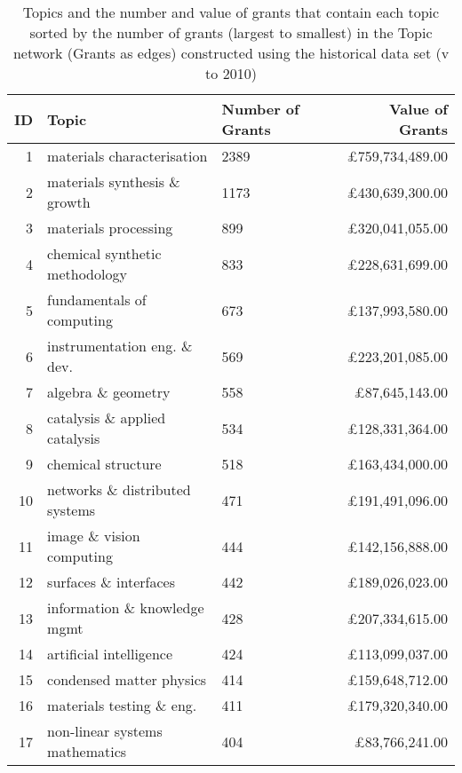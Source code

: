 \begin{spacing}{0.9}
\begin{longtable}[c]{r|>{\raggedleft\arraybackslash}m{6.5cm}|>{\raggedleft\arraybackslash}m{1.9cm}|r}
\caption[Topics and the number and value of grants that contain each topic in the Topic network (Grants as edges) constructed using the historical data set (2000 to 2010)]{Topics and the number and value of grants that contain each topic sorted by the number of grants (largest to smallest) in the Topic network (Grants as edges) constructed using the historical data set (v to 2010)}\\
\label{table:topic_a_past1_topics_appendix}
\textbf{ID} & \textbf{Topic} & \textbf{Number of Grants} & \textbf{Value of Grants}\\
\hline
\endhead
{1} & {materials characterisation} & {2389} & {\pounds759,734,489.00}\\
{2} & {materials synthesis \& growth} & {1173} & {\pounds430,639,300.00}\\
{3} & {materials processing} & {899} & {\pounds320,041,055.00}\\
{4} & {chemical synthetic methodology} & {833} & {\pounds228,631,699.00}\\
{5} & {fundamentals of computing} & {673} & {\pounds137,993,580.00}\\
{6} & {instrumentation eng. \& dev.} & {569} & {\pounds223,201,085.00}\\
{7} & {algebra \& geometry} & {558} & {\pounds87,645,143.00}\\
{8} & {catalysis \& applied catalysis} & {534} & {\pounds128,331,364.00}\\
{9} & {chemical structure} & {518} & {\pounds163,434,000.00}\\
{10} & {networks \& distributed systems} & {471} & {\pounds191,491,096.00}\\
{11} & {image \& vision computing} & {444} & {\pounds142,156,888.00}\\
{12} & {surfaces \& interfaces} & {442} & {\pounds189,026,023.00}\\
{13} & {information \& knowledge mgmt} & {428} & {\pounds207,334,615.00}\\
{14} & {artificial intelligence} & {424} & {\pounds113,099,037.00}\\
{15} & {condensed matter physics} & {414} & {\pounds159,648,712.00}\\
{16} & {materials testing \& eng.} & {411} & {\pounds179,320,340.00}\\
{17} & {non-linear systems mathematics} & {404} & {\pounds83,766,241.00}\\

\end{longtable}
\end{spacing}
